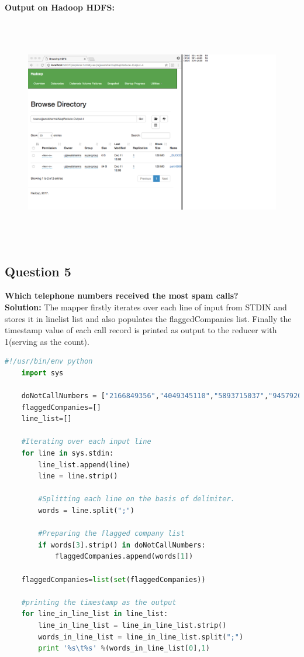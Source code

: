 \documentclass[a4paper, 10pt]{article}
\begin{document}
\noindent
\textbf{Output on Hadoop HDFS:}
\begin{figure}[!htbp]
    \centering
    \includegraphics[height=10cm]{Hadoop4.png}
\end{figure}

\subsection{Question 5}
\textbf{Which telephone numbers received the most spam calls?}\\
\noindent
\textbf{Solution:}
The mapper firstly iterates over each line of input from STDIN and stores it in linelist list and also populates the flaggedCompanies list.
Finally the timestamp value of each call record is printed as output to the reducer with 1(serving as the count). 

\begin{lstlisting}[language=Python, caption=Mapper for problem 5]
    #!/usr/bin/env python
    import sys
    
    doNotCallNumbers = ["2166849356","4049345110","5893715037","9457920329"]
    flaggedCompanies=[]
    line_list=[]

    #Iterating over each input line
    for line in sys.stdin:
        line_list.append(line)
        line = line.strip()

        #Splitting each line on the basis of delimiter.
        words = line.split(";")

        #Preparing the flagged company list
        if words[3].strip() in doNotCallNumbers:
            flaggedCompanies.append(words[1])
    
    flaggedCompanies=list(set(flaggedCompanies))
    
    #printing the timestamp as the output
    for line_in_line_list in line_list:
        line_in_line_list = line_in_line_list.strip()
        words_in_line_list = line_in_line_list.split(";")
        print '%s\t%s' %(words_in_line_list[0],1)   
\end{lstlisting}
\end{document}
